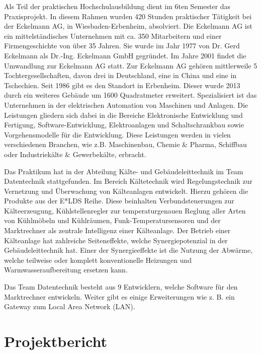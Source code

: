 \documentclass{article}
\begin{document}
Als Teil der praktischen Hochschulausbildung dient im 6ten Semester das Praxisprojekt. In diesem Rahmen wurden 420 Stunden praktischer Tätigkeit bei der Eckelmann AG, in Wiesbaden-Erbenheim, absolviert. Die Eckelmann AG ist ein mittelständisches Unternehmen mit ca. 350 Mitarbeitern und einer Firmengeschichte von über 35 Jahren. Sie wurde im Jahr 1977 von Dr. Gerd Eckelmann als  Dr.-Ing. Eckelmann GmbH gegründet. Im Jahre 2001 findet die Umwandlung zur Eckelmann AG statt. Zur Eckelmann AG gehören mittlerweile 5 Tochtergesellschaften, davon drei in Deutschland, eine in China und eine in Tschechien. Seit 1986 gibt es den Standort in Erbenheim. Dieser wurde 2013 durch ein weiteres Gebäude um 1600 Quadratmeter erweitert. Spezialisiert ist das Unternehmen in der elektrischen Automation von Maschinen und Anlagen. Die Leistungen gliedern sich dabei in die Bereiche Elektronische Entwicklung und Fertigung, Software-Entwicklung, Elektroanlagen und Schaltschrankbau sowie Vorgehensmodelle für die Entwicklung. Diese Leistungen werden in vielen verschiedenen Branchen, wie z.B. Maschinenbau, Chemie \& Pharma, Schiffbau oder Industriekälte \& Gewerbekälte, erbracht.

Das Praktikum hat in der Abteilung Kälte- und Gebäudeleittechnik im Team Datentechnik stattgefunden. Im Bereich Kältetechnik wird Regelungstechnik zur Vernetzung und Überwachung von Kälteanlagen entwickelt. Hierzu gehören die Produkte aus der E*LDS Reihe. Diese beinhalten Verbundsteuerungen zur Kälteerzeugung, Kühlstellenregler zur temperaturgenauen Reglung aller Arten von Kühlmöbeln und Kühlräumen, Funk-Temperatursensoren und der Marktrechner als zentrale Intelligenz einer Kälteanlage. Der Betrieb einer Kälteanlage hat zahlreiche Seiteneffekte, welche Synergiepotenzial in der Gebäudeleittechnik hat. Einer der Synergieeffekte ist die Nutzung der Abwärme, welche teilweise oder komplett konventionelle Heizungen und Warmwasseraufbereitung ersetzen kann.

Das Team Datentechnik besteht aus 9 Entwicklern, welche Software für den Marktrechner entwickeln. Weiter gibt es einige Erweiterungen wie z. B. ein Gateway zum Local Area Network (LAN).
\pagebreak


\section{Projektbericht}
\end{document}
